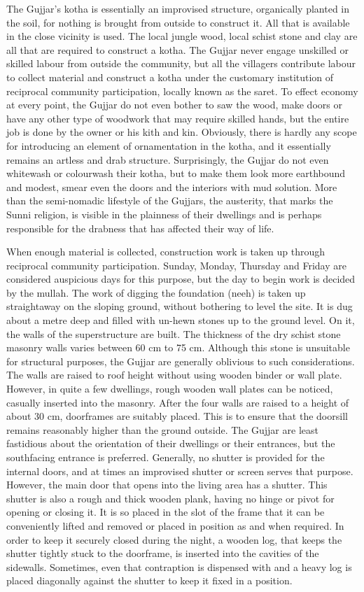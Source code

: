 The Gujjar’s kotha is essentially an improvised structure, organically planted in the soil, for nothing is brought from outside to construct it. All that is available in the close vicinity is used. The local jungle wood, local schist stone and clay are all that are required to construct a kotha. The Gujjar never engage unskilled or skilled labour from outside the community, but all the villagers contribute labour to collect material and construct a kotha under the customary institution of reciprocal community participation, locally known as the saret. To effect economy at every point, the Gujjar do not even bother to saw the wood, make doors or have any other type of woodwork that may require skilled hands, but the entire job is done by the owner or his kith and kin. Obviously, there is hardly any scope for introducing an element of ornamentation in the kotha, and it essentially remains an artless and drab structure. Surprisingly, the Gujjar do not even whitewash or colourwash their kotha, but to make them look more earthbound and modest, smear even the doors and the interiors with mud solution. More than the semi-nomadic lifestyle of the Gujjars, the austerity, that marks the Sunni religion, is visible in the plainness of their dwellings and is perhaps responsible for the drabness that has affected their way of life.

When enough material is collected, construction work is taken up through reciprocal community participation. Sunday, Monday, Thursday and Friday are considered auspicious days for this purpose, but the day to begin work is decided by the mullah. The work of digging the foundation (neeh) is taken up straightaway on the sloping ground, without bothering to level the site. It is dug about a metre deep and filled with un-hewn stones up to the ground level. On it, the walls of the superstructure are built. The thickness of the dry schist stone masonry walls varies between 60 cm to 75 cm. Although this stone is unsuitable for structural purposes, the Gujjar are generally oblivious to such considerations. The walls are raised to roof height without using wooden binder or wall plate. However, in quite a few dwellings, rough wooden wall plates can be noticed, casually inserted into the masonry. After the four walls are raised to a height of about 30 cm, doorframes are suitably placed. This is to ensure that the doorsill remains reasonably higher than the ground outside. The Gujjar are least fastidious about the orientation of their dwellings or their entrances, but the southfacing entrance is preferred. Generally, no shutter is provided for the internal doors, and at times an improvised shutter or screen serves that purpose. However, the main door that opens into the living area has a shutter. This shutter is also a rough and thick wooden plank, having no hinge or pivot for opening or closing it. It is so placed in the slot of the frame that it can be conveniently lifted and removed or placed in position as and when required. In order to keep it securely closed during the night, a wooden log, that keeps the shutter tightly stuck to the doorframe, is inserted into the cavities of the sidewalls. Sometimes, even that contraption is dispensed with and a heavy log is placed diagonally against the shutter to keep it fixed in a position.

